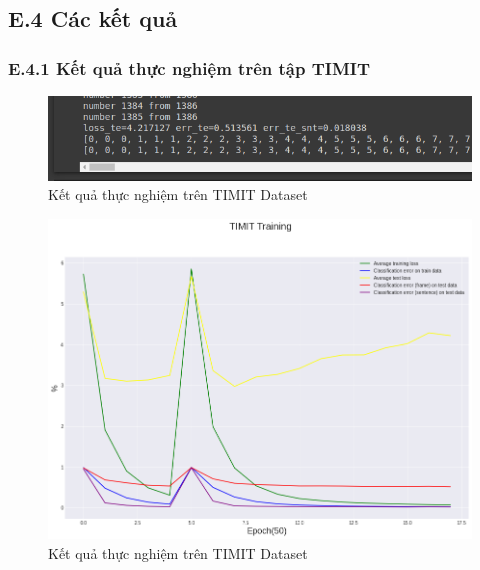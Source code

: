 \documentclass{article}
\begin{document}
	\subsection{E.4 Các kết quả}
	\subsubsection{E.4.1 Kết quả thực nghiệm trên tập TIMIT}
	\begin{figure}[H]
		\centering
		\includegraphics[width=.75\textwidth]{result/evaluate_result_timit.png}
		\caption{Kết quả thực nghiệm trên TIMIT Dataset}
		\label{fig:writing-thesis}
	\end{figure}
	\begin{figure}[H]
		\centering
		\includegraphics[width=.75\textwidth]{result/sincnet_timit_plot.png}
		\caption{Kết quả thực nghiệm trên TIMIT Dataset}
		\label{fig:writing-thesis}
	\end{figure}
\end{document}
